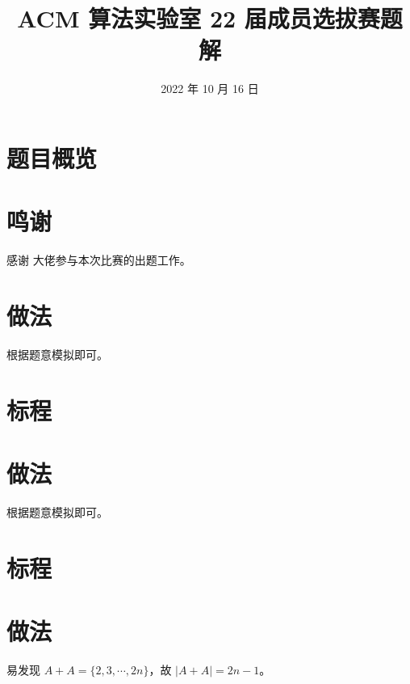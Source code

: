 \documentclass{../cpct/ctsol}
\title{ACM 算法实验室 22 届成员选拔赛题解}
\date{2022 年 10 月 16 日}
\begin{document}
\maketitle
{}

\section*{题目概览}

\solutiontab

\section*{鸣谢}

感谢 \href{https://github.com/Tiphereth-A}{\@Tifa} 大佬参与本次比赛的出题工作。

\makesolution
\section*{做法}

根据题意模拟即可。

\section*{标程}


\makesolution
\section*{做法}

根据题意模拟即可。

\section*{标程}


\makesolution
\section*{做法}

易发现 $A+A = \{2,3,\cdots,2n \}$，故 $|A+A|=2n-1$。
\end{document}
